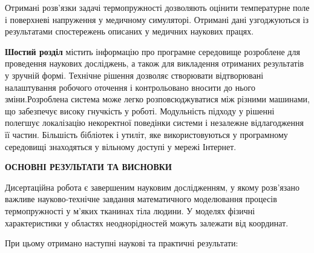 Отримані розв'язки задачі термопружності дозволяють оцінити температурне поле і поверхневі напруження у медичному 
симуляторі. Отримані дані узгоджуються із результатами спостережень описаних у медичних наукових працях.

\textbf{Шостий розділ} містить інформацію про програмне середовище розроблене для проведення наукових досліджень, а
також для викладення отриманих результатів у зручній формі. Технічне рішення дозволяє створювати відтворювані
налаштування робочого оточення і контрольовано вносити до нього зміни.Розроблена система може легко розповсюджуватися
між різними машинами, що забезпечує високу гнучкість у роботі. Модульність підходу у рішенні полегшує локалізацію
некоректної поведінки системи і незалежне відлагодження її частин. Більшість бібліотек і утиліт, яке використовуються у
програмному середовищі знаходяться у вільному доступі у мережі Інтернет.

\begin{center}
    \textbf{ОСНОВНІ РЕЗУЛЬТАТИ ТА ВИСНОВКИ}
\end{center}

Дисертаційна робота є завершеним науковим дослідженням, у якому розв'язано важливе науково-технічне завдання
математичного моделювання процесів термопружності у м'яких тканинах тіла людини. У моделях фізичні характеристики у 
областях неоднорідностей можуть залежати від координат.

При цьому отримано наступні наукові та практичні результати:

